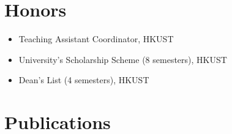 \documentclass{mycv}
\begin{document}
\section{Honors}


\begin{itemize}
  \item Teaching Assistant Coordinator, HKUST 
  \item University's Scholarship Scheme (8 semesters), HKUST
  \item Dean's List (4 semesters), HKUST
\end{itemize}

\section{Publications}%


\end{document}
